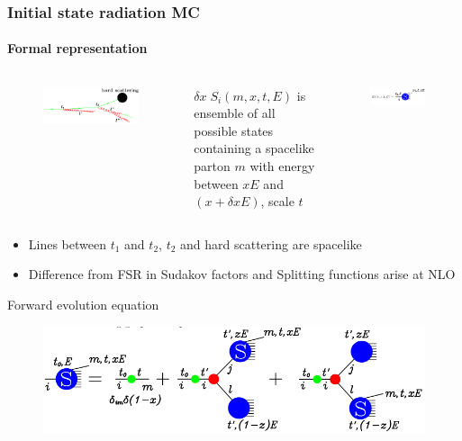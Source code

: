 \documentclass[aspectratio=43]{beamer}
\begin{document}
\begin{frame}
	
	\frametitle{Initial state radiation MC}
	\framesubtitle{Formal representation}
		
	\begin{columns}

	
		\begin{figure}
			\includegraphics[width = 4.5 cm]{plots/ISR_shower_1a.png}
		\end{figure}
	

			\footnotesize $\delta x \; S_{i}(m, x, t, E)$ is ensemble of all possible states containing a spacelike parton $m$ with energy between $xE$ and $(x + \delta x E)$, scale $t$
	
		\begin{figure}
			\includegraphics[width = 4.5 cm]{plots/ISR_shower_1b.png}
		\end{figure}
			
	\end{columns}

	\begin{itemize} 
		\item \footnotesize Lines between $t_{1}$ and $t_{2}$, $t_{2}$ and hard scattering are spacelike
		\item \footnotesize Difference from FSR in Sudakov factors and Splitting functions arise at NLO
	\end{itemize}
	
	\footnotesize Forward evolution equation
	\begin{figure}
		\includegraphics[width = 8.5 cm]{plots/ISR_shower_2.png}
	\end{figure}

\end{frame}
\end{document}
